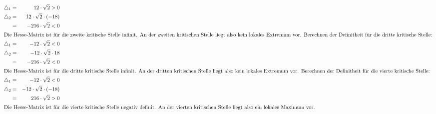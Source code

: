 \documentclass[10pt,a4paper,oneside,ngerman,numbers=noenddot]{scrartcl}
\begin{document}
\begin{alignat*}{2}
\bigtriangleup_{1} &=& 12 \cdot \sqrt{2} > 0 \\
\bigtriangleup_{2} &=& 12 \cdot \sqrt{2} \cdot (-18) \\
&=& -216 \cdot \sqrt{2} < 0 \\
\intertext{Die Hesse-Matrix ist für die zweite kritische Stelle infinit. An der zweiten kritischen Stelle liegt also kein lokales Extremum vor. Berechnen der Definitheit für die dritte kritische Stelle:}
\bigtriangleup_{1} &=& -12 \cdot \sqrt{2} < 0 \\
\bigtriangleup_{2} &=& -12 \cdot \sqrt{2} \cdot 18 \\
&=& -216 \cdot \sqrt{2} < 0 \\
\intertext{Die Hesse-Matrix ist für die dritte kritische Stelle infinit. An der dritten kritischen Stelle liegt also kein lokales Extremum vor. Berechnen der Definitheit für die vierte kritische Stelle:}
\bigtriangleup_{1} &=& -12 \cdot \sqrt{2} < 0 \\
\bigtriangleup_{2} &=& -12 \cdot \sqrt{2} \cdot (-18) \\
&=& 216 \cdot \sqrt{2} > 0 \\
\intertext{Die Hesse-Matrix ist für die vierte kritische Stelle negativ definit. An der vierten kritischen Stelle liegt also ein lokales Maximum vor.}
\end{alignat*}
\section{} %
\end{document}
